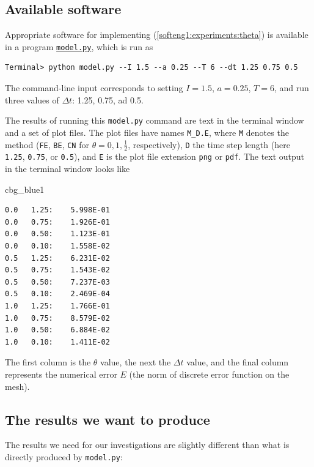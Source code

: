 \documentclass[%
oneside,                 %
final,                   %
10pt]{article}
\newenvironment{_cod_tight}[1]{
   \def\FrameCommand{\colorbox{#1}}
   \FrameRule0.6pt\MakeFramed {\FrameRestore}\vskip3mm}
   {\vskip0mm\endMakeFramed}
\newenvironment{cod}[1]{
\bgroup\rmfamily
\fboxsep=0mm\relax
\begin{_cod_tight}{#1}
\list{}{\parsep=-2mm\parskip=0mm\topsep=0pt\leftmargin=2mm
\rightmargin=2\leftmargin\leftmargin=4pt\relax}
\item\relax}
{\endlist\end{_cod_tight}\egroup}
\begin{document}
\subsection{Available software}

Appropriate software for implementing (\ref{softeng1:experiments:theta})
is available in a program \href{{http://tinyurl.com/nc4upel/doconce_src/model.py}}{\nolinkurl{model.py}}, which is run as

\begin{Verbatim}[frame=lines,label=\fbox{{\tiny Terminal}},framesep=2.5mm,framerule=0.7pt,fontsize=\fontsize{9pt}{9pt}]
Terminal> python model.py --I 1.5 --a 0.25 --T 6 --dt 1.25 0.75 0.5
\end{Verbatim}
The command-line input corresponds to setting $I=1.5$, $a=0.25$, $T=6$,
and run three values of $\Delta t$: 1.25, 0.75, ad 0.5.

The results of running this \texttt{model.py} command are text in the
terminal window and a set of plot files.
The plot files have names \Verb!M_D.E!, where \texttt{M} denotes the method
(\texttt{FE}, \texttt{BE}, \texttt{CN} for $\theta=0,1,\frac{1}{2}$, respectively), \texttt{D}
the time step length (here \texttt{1.25}, \texttt{0.75}, or \texttt{0.5}), and \texttt{E}
is the plot file extension \texttt{png} or \texttt{pdf}.
The text output in the terminal window looks like

\begin{cod}{cbg_blue1}\begin{Verbatim}[numbers=none,fontsize=\fontsize{9pt}{9pt},baselinestretch=0.95,xleftmargin=2mm]
0.0   1.25:    5.998E-01
0.0   0.75:    1.926E-01
0.0   0.50:    1.123E-01
0.0   0.10:    1.558E-02
0.5   1.25:    6.231E-02
0.5   0.75:    1.543E-02
0.5   0.50:    7.237E-03
0.5   0.10:    2.469E-04
1.0   1.25:    1.766E-01
1.0   0.75:    8.579E-02
1.0   0.50:    6.884E-02
1.0   0.10:    1.411E-02
\end{Verbatim}
\end{cod}
\noindent
The first column is the $\theta$ value, the next the $\Delta t$ value,
and the final column represents the numerical error $E$ (the
norm of discrete error function on the mesh).

\subsection{The results we want to produce}

The results we need for our investigations are slightly different than
what is directly produced by \texttt{model.py}:
\end{document}
